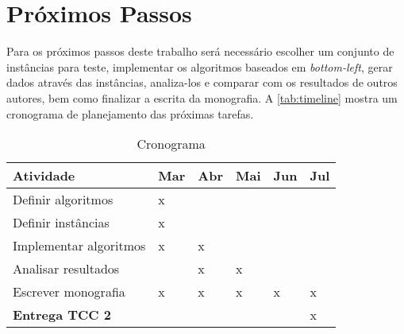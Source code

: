\chapter{Próximos Passos}\label{ch:proximos-passos}

Para os próximos passos deste trabalho será necessário escolher um conjunto de instâncias para teste, implementar os algoritmos baseados em \textit{bottom-left}, gerar dados através das instâncias, analiza-los e comparar com os resultados de outros autores, bem como finalizar a escrita da monografia.
A \autoref{tab:timeline} mostra um cronograma de planejamento das próximas tarefas.

\begin{table}[h!]
    \begin{tabularx}{\textwidth}{|l|X|X|X|X|X|}
        \hline
        \textbf{Atividade}                                & Mar & Abr & Mai & Jun & Jul \\
        \hline
        \multicolumn{1}{|p{6em}|}{Definir algoritmos}     & x   &     &     &     &     \\
        \hline
        \multicolumn{1}{|p{6em}|}{Definir instâncias}     & x   &     &     &     &     \\
        \hline
        \multicolumn{1}{|p{6em}|}{Implementar algoritmos} & x   & x   &     &     &     \\
        \hline
        \multicolumn{1}{|p{6em}|}{Analisar resultados}    &     & x   & x   &     &     \\
        \hline
        \multicolumn{1}{|p{6em}|}{Escrever monografia}    & x   & x   & x   & x   & x   \\
        \hline
        \multicolumn{1}{|p{6em}|}{\textbf{Entrega TCC 2}} &     &     &     &     & x   \\
        \hline
    \end{tabularx}
    \caption{Cronograma}
    \label{tab:timeline}
\end{table}
